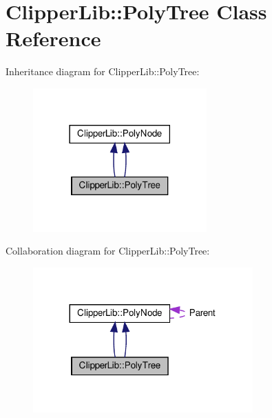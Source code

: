 \hypertarget{classClipperLib_1_1PolyTree}{}\section{Clipper\+Lib\+:\+:Poly\+Tree Class Reference}
\label{classClipperLib_1_1PolyTree}


Inheritance diagram for Clipper\+Lib\+:\+:Poly\+Tree\+:
\nopagebreak
\begin{figure}[H]
\begin{center}
\leavevmode
\includegraphics[width=189pt]{classClipperLib_1_1PolyTree__inherit__graph}
\end{center}
\end{figure}


Collaboration diagram for Clipper\+Lib\+:\+:Poly\+Tree\+:
\nopagebreak
\begin{figure}[H]
\begin{center}
\leavevmode
\includegraphics[width=239pt]{classClipperLib_1_1PolyTree__coll__graph}
\end{center}
\end{figure}
